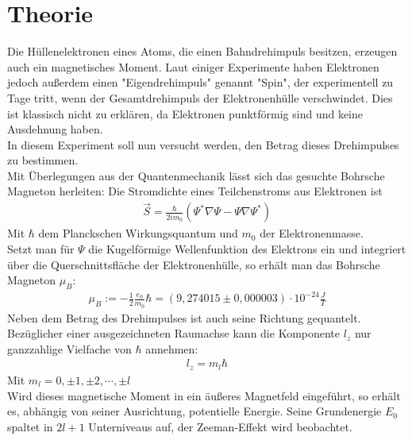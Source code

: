 

\section{Theorie}
\setcounter{page}{1}
Die Hüllenelektronen eines Atoms, die einen Bahndrehimpuls besitzen, erzeugen auch
ein magnetisches Moment. Laut einiger Experimente haben Elektronen jedoch außerdem einen "Eigendrehimpuls" genannt "Spin", der experimentell zu Tage tritt, wenn der Gesamtdrehimpuls der Elektronenhülle verschwindet. Dies ist klassisch nicht zu erklären, da Elektronen punktförmig sind und keine Ausdehnung haben.\\
In diesem Experiment soll nun versucht werden, den Betrag dieses Drehimpulses zu bestimmen.\\

Mit Überlegungen aus der Quantenmechanik lässt sich das gesuchte Bohrsche Magneton herleiten: Die Stromdichte eines Teilchenstroms aus Elektronen ist 
\begin{align}
\vec{S} = \frac{\hbar}{2im_0} (\Psi^* \nabla \Psi - \Psi \nabla \Psi^*)
\end{align}
Mit $\hbar$ dem Planckschen Wirkungsquantum und $m_0$ der Elektronenmasse.\\

Setzt man für $\Psi$ die Kugelförmige Wellenfunktion des Elektrons ein und integriert über die Querschnittsfläche der Elektronenhülle, so erhält man das Bohrsche Magneton $\mu_B$:
\begin{align}
\mu_B := -\frac{1}{2}\frac{e_0}{m_0}\hbar= (9,274015 \pm 0,000003)\cdot10^{-24} \frac{J}{T}
\end{align}
Neben dem Betrag des Drehimpulses ist auch seine Richtung gequantelt. Bezüglicher einer ausgezeichneten Raumachse kann die Komponente $l_z$ nur ganzzahlige Vielfache von $\hbar$ annehmen:
\begin{align}
l_z=m_l\hbar
\end{align}
Mit $m_l = 0, \pm 1, \pm 2,\cdots , \pm l$\\

Wird dieses magnetische Moment in ein äußeres Magnetfeld eingeführt, so erhält es, abhängig von seiner Ausrichtung, potentielle Energie. Seine Grundenergie $E_0$ spaltet in $2l+1$ Unterniveaus auf, der Zeeman-Effekt wird beobachtet.\\


